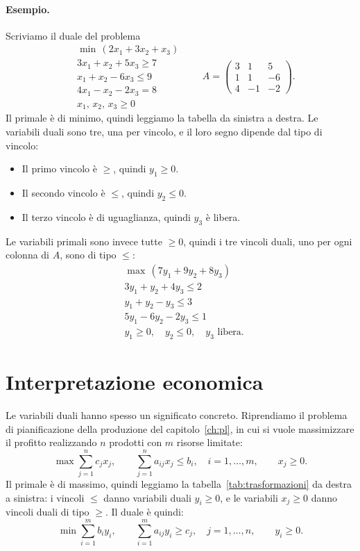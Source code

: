 \paragraph{Esempio.}
Scriviamo il duale del problema
\[
\begin{aligned}
&\min\, (2x_1 + 3x_2 + x_3) \\
&3x_1 + x_2 + 5x_3 \ge 7 \\
&x_1 + x_2 - 6x_3 \le 9 \\
&4x_1 - x_2 - 2x_3 = 8 \\
&x_1,\, x_2,\, x_3 \ge 0
\end{aligned}
\qquad
A = \begin{pmatrix} 3 & 1 & 5 \\ 1 & 1 & -6 \\ 4 & -1 & -2 \end{pmatrix}.
\]
Il primale è di minimo, quindi leggiamo la tabella da sinistra a destra. Le variabili duali sono tre, una per vincolo, e il loro segno dipende dal tipo di vincolo:
\begin{itemize}
    \item Il primo vincolo è $\ge$, quindi $y_1 \ge 0$.
    \item Il secondo vincolo è $\le$, quindi $y_2 \le 0$.
    \item Il terzo vincolo è di uguaglianza, quindi $y_3$ è libera.
\end{itemize}
Le variabili primali sono invece tutte $\ge 0$, quindi i tre vincoli duali, uno per ogni colonna di $A$, sono di tipo $\le$:
\[
\begin{aligned}
&\max\, (7y_1 + 9y_2 + 8y_3) \\
&3y_1 + y_2 + 4y_3 \le 2 \\
&y_1 + y_2 - y_3 \le 3 \\
&5y_1 - 6y_2 - 2y_3 \le 1 \\
&y_1 \ge 0, \quad y_2 \le 0, \quad y_3 \text{ libera.}
\end{aligned}
\]

\section{Interpretazione economica}\label{sec:duale-economico}
Le variabili duali hanno spesso un significato concreto. Riprendiamo il problema di pianificazione della produzione del capitolo~\ref{ch:pl}, in cui si vuole massimizzare il profitto realizzando $n$ prodotti con $m$ risorse limitate:
\[
\max \sum_{j=1}^{n} c_j x_j, \qquad \sum_{j=1}^{n} a_{ij} x_j \le b_i, \quad i = 1, \dots, m, \qquad x_j \ge 0.
\]
Il primale è di massimo, quindi leggiamo la tabella~\ref{tab:trasformazioni} da destra a sinistra: i vincoli $\le$ danno variabili duali $y_i \ge 0$, e le variabili $x_j \ge 0$ danno vincoli duali di tipo $\ge$. Il duale è quindi:
\[
\min \sum_{i=1}^{m} b_i y_i, \qquad \sum_{i=1}^{m} a_{ij} y_i \ge c_j, \quad j = 1, \dots, n, \qquad y_i \ge 0.
\]

